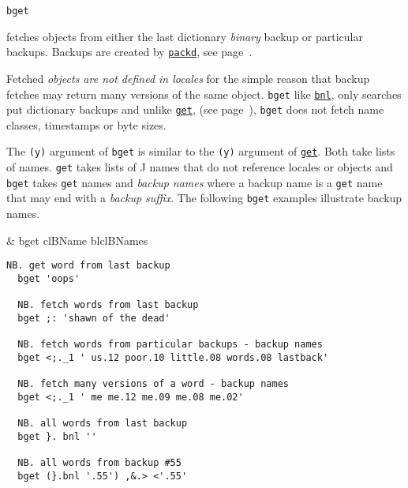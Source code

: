  \hypertarget{il:bget}{\texttt{bget}} fetches objects from either the last dictionary \emph{binary} backup or particular backups.
  Backups are created by \hyperlink{il:packd}{\texttt{packd}}, see page~\pageref{ss:packd}.
  
  Fetched \emph{objects are not defined in locales} for the simple reason that
  backup fetches may return many versions of the same object.
  \texttt{bget} like \hyperlink{il:bnl}{\texttt{bnl}}, only searches put dictionary backups 
  and unlike \hyperlink{il:get}{\texttt{get}}, (see page~\pageref{ss:get}), \texttt{bget} does 
  not fetch name classes, timestamps or byte sizes. 
  
  The \texttt{(y)} argument of \texttt{bget} is similar to the \texttt{(y)} argument of 
  \hyperlink{il:get}{\texttt{get}}. Both take
  lists of names. \texttt{get} takes lists of J names that do not reference
  locales or objects and \texttt{bget} takes \texttt{get} names and
  \emph{backup names} where a backup name is a \texttt{get} name that may end with a \emph{backup suffix}.
  The following \texttt{bget} examples illustrate backup names.
   
    \begin{wordhead}
\monad & bget clBName \argsep blclBNames \\
\end{wordhead}
\begin{lstlisting}[frame=single,framerule=0pt]
  NB. get word from last backup
  bget 'oops'
  
  NB. fetch words from last backup
  bget ;: 'shawn of the dead'
  
  NB. fetch words from particular backups - backup names
  bget <;._1 ' us.12 poor.10 little.08 words.08 lastback'
  
  NB. fetch many versions of a word - backup names
  bget <;._1 ' me me.12 me.09 me.08 me.02'
  
  NB. all words from last backup
  bget }. bnl ''
  
  NB. all words from backup #55
  bget (}.bnl '.55') ,&.> <'.55'
\end{lstlisting}

